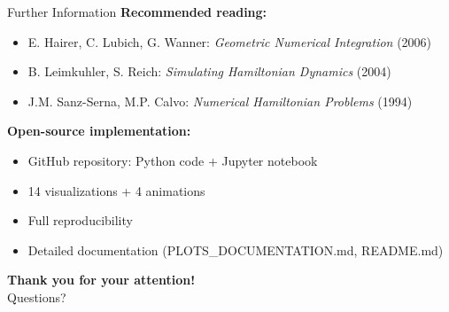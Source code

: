 \documentclass[aspectratio=169]{beamer}
\begin{document}
\begin{frame}{Further Information}
\textbf{Recommended reading:}
\begin{itemize}
    \item E. Hairer, C. Lubich, G. Wanner: \emph{Geometric Numerical Integration} (2006)
    \item B. Leimkuhler, S. Reich: \emph{Simulating Hamiltonian Dynamics} (2004)
    \item J.M. Sanz-Serna, M.P. Calvo: \emph{Numerical Hamiltonian Problems} (1994)
\end{itemize}

\vspace{0.3cm}

\textbf{Open-source implementation:}
\begin{itemize}
    \item GitHub repository: Python code + Jupyter notebook
    \item 14 visualizations + 4 animations
    \item Full reproducibility
    \item Detailed documentation (PLOTS\_DOCUMENTATION.md, README.md)
\end{itemize}

\vspace{0.3cm}

\begin{center}
\Large
\textbf{Thank you for your attention!}\\
\vspace{0.2cm}
\normalsize
Questions?
\end{center}
\end{frame}
\end{document}
